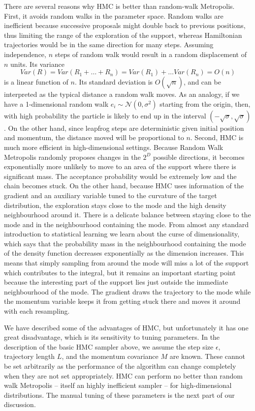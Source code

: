 \documentclass[12pt]{report}
\begin{document}
There are several reasons why HMC is better than random-walk Metropolis. First,
it avoids random walks in the parameter space. Random walks are inefficient because successive
proposals might double back to previous positions, thus limiting the range of
the exploration of the support, whereas Hamiltonian trajectories would be in the
same direction for many steps. Assuming independence, $n$ steps of random walk
would result in a random displacement of $n$ units. Its variance  
\[Var(R) = Var(R_1 + \dots + R_n) = Var(R_1) + \dots Var(R_n) = O(n) \]
is a linear function of $n$. Its standard deviation is $O(\sqrt{n})$, and can be
interpreted as the typical distance a random walk moves. As an analogy, if we
have a 1-dimensional random walk $e_i \sim \mathcal{N}(0,\sigma^2)$ starting from
the origin, then,  with high probability the particle is likely to end up in the
interval $(-\sqrt{\sigma},\sqrt{\sigma})$. 
On the other hand, since leapfrog steps are deterministic given initial position
and momentum, the distance moved will be proportional to $n$. 
Second, HMC is much more efficient in
high-dimensional settings. Because Random Walk Metropolis randomly proposes changes in
the $2^D$ possible directions, it becomes exponentially more unlikely to move
to an area of the support where there is significant mass. The acceptance
probability would be extremely low and the chain becomes stuck. On the other
hand, because HMC uses information of the gradient and an auxiliary variable
tuned to the curvature of the target distribution, the exploration stays close
to the mode and the high density neighbourhood around it. There is a delicate
balance between staying close to the mode and in the neighbourhood containing
the mode. From almost any standard introduction to statistical learning \cite{friedman2001elements} we learn about the curse of dimensionality, which says that the probability mass in the neighbourhood containing the mode of the density function decreases exponentially as the dimension increases. This means that simply sampling from around the mode will miss a lot of the support which contributes to the integral, but it remains an important starting point because the interesting part of the support lies just outside the immediate neighbourhood of the mode. The gradient draws the
trajectory to
the mode while the momentum variable keeps it from getting stuck there and moves it around with each resampling.



We have described some of the advantages of HMC, but unfortunately it has one great disadvantage, which is its sensitivity to tuning parameters. 
In the description of the basic HMC sampler above, we assume the step size $\epsilon$, trajectory length $L$, and the momentum covariance $M$ are known. These cannot be set arbitrarily as the performance of the algorithm can change completely when they are not set appropriately. HMC can perform no better than random walk Metropolis -- itself an highly inefficient sampler -- for high-dimensional distributions. The manual tuning of these parameters is the next part of our discussion. 
\end{document}

